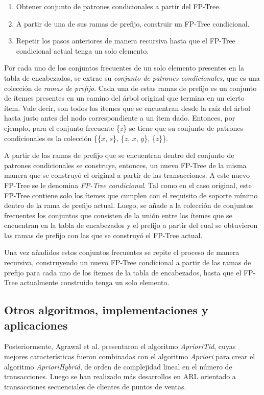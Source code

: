 \begin{enumerate}
\item Obtener conjunto de patrones condicionales a partir del FP-Tree.
\item A partir de una de sus ramas de prefijo, construir un FP-Tree condicional.
\item Repetir los pasos anteriores de manera recursiva hasta que el FP-Tree condicional actual tenga un solo elemento.
\end{enumerate}

Por cada uno de los conjuntos frecuentes de un solo elemento presentes en la tabla de encabezados, se extrae su \textit{conjunto de patrones condicionales}, que es una colección de \textit{ramas de prefijo}. Cada una de estas ramas de prefijo es un conjunto de ítemes presentes en un camino del árbol original que termina en un cierto ítem. Vale decir, son todos los ítemes que se encuentran desde la raíz del árbol hasta justo antes del nodo correspondiente a un ítem dado. Entonces, por ejemplo, para el conjunto frecuente \{$z$\} se tiene que su conjunto de patrones condicionales es la colección \{\{$x$, $s$\}, \{$z$, $x$, $y$\}, \{$z$\}\}.

A partir de las ramas de prefijo que se encuentran dentro del conjunto de patrones condicionales se construye, entonces, un nuevo FP-Tree de la misma manera que se construyó el original a partir de las transacciones. A este nuevo FP-Tree se le denomina \textit{FP-Tree condicional}. Tal como en el caso original, este FP-Tree contiene solo los ítemes que cumplen con el requisito de soporte mínimo dentro de la rama de prefijo actual. Luego, se añade a la colección de conjuntos frecuentes los conjuntos que consisten de la unión entre los ítemes que se encuentran en la tabla de encabezados y el prefijo a partir del cual se obtuvieron las ramas de prefijo con las que se construyó el FP-Tree actual.

Una vez añadidos estos conjuntos frecuentes se repite el proceso de manera recursiva, construyendo un nuevo FP-Tree condicional a partir de las ramas de prefijo para cada uno de los ítemes de la tabla de encabezados, hasta que el FP-Tree actualmente construido tenga un solo elemento.

\subsection{Otros algoritmos, implementaciones y aplicaciones}

Posteriormente, Agrawal et al. presentaron el algoritmo \textit{AprioriTid}, cuyas mejores características fueron combinadas con el algoritmo \textit{Apriori} para crear el algoritmo \textit{AprioriHybrid}, de orden de complejidad lineal en el número de transacciones\cite{agrawal1994fast}. Luego se han realizado más desarrollos en ARL orientado a transacciones secuenciales de clientes de puntos de ventas\cite{agrawal1995mining}.


